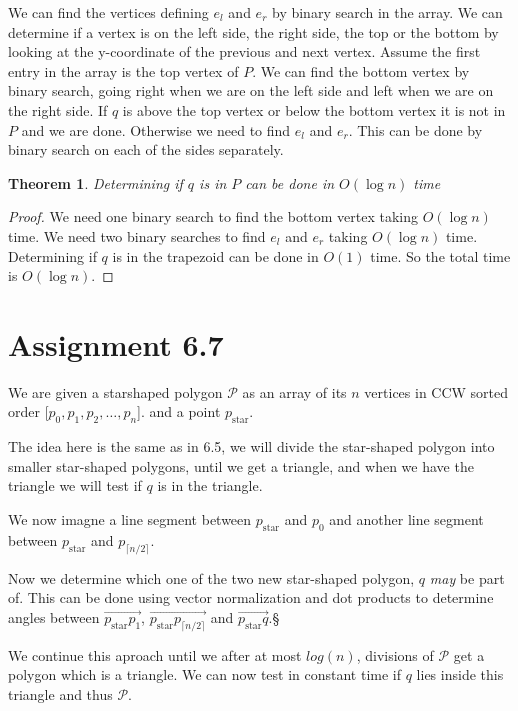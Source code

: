 \documentclass[10pt,a4paper,final,oneside,openany,article,oldfontcommands]{memoir}
\newtheorem{pinQtime}[pinQ]{Theorem}
\begin{document}
We can find the vertices defining $e_l$ and $e_r$ by binary search in the array.
We can determine if a vertex is on the left side, the right side, the top or the bottom by looking at the y-coordinate of the previous and next vertex. 
Assume the first entry in the array is the top vertex of $P$. We can find the bottom vertex by binary search, going right when we are on the left side and left when we are on the right side. If $q$ is above the top vertex or below the bottom vertex it is not in $P$ and we are done. Otherwise we need to find $e_l$ and $e_r$. This can be done by binary search on each of the sides separately. 

\begin{pinQtime}
  Determining if $q$ is in $P$ can be done in $O(\log n)$ time
\end{pinQtime}

\begin{proof}
  We need one binary search to find the bottom vertex taking $O(\log n)$ time. We need two binary searches to find $e_l$ and $e_r$ taking $O(\log n)$ time. Determining if $q$ is in the trapezoid can be done in $O(1)$ time. So the total time is $O(\log n)$.
\end{proof}

\chapter*{Assignment 6.7}
We are given a starshaped polygon $\mathcal{P}$ as an array of its $n$ vertices in
CCW sorted order [$p_0, p_1,p_2, \dots, p_n$]. and a point $p_\textrm{star}$.

The idea here is the same as in 6.5, we will divide the star-shaped polygon
into smaller star-shaped polygons, until we get a triangle, and when we have
the triangle we will test if $q$ is in the triangle.

We now imagne a line segment between $p_\textrm{star}$ and $p_0$ and another
line segment between $p_\textrm{star}$ and $p_{\lceil n/2 \rceil}$.

Now we determine which one of the two new star-shaped polygon, $q$
\emph{may} be part of. This can be done using vector normalization and
dot products to determine angles between $\vec{p_\textrm{star}p_1}$,
$\vec{p_\textrm{star}p_{\lceil n/2 \rceil}}$ and $\vec{p_\textrm{star}q}$.§

We continue this aproach until we after at most $log(n)$, divisions of
$\mathcal{P}$ get a polygon which is a triangle. We can now test in constant
time if $q$ lies inside this triangle and thus $\mathcal{P}$.
\end{document}
